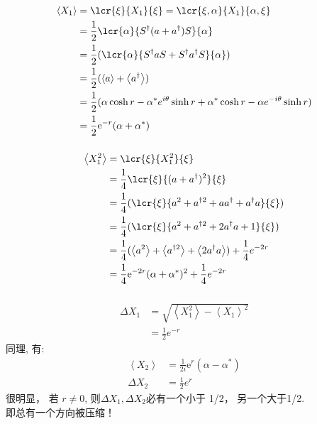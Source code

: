 \begin{frame}
 \frametitle{}
 \例 [5. 试计算压缩光场正交分量的量子涨落 ]{
    \[ \Delta X_1 \Delta X_2 =\dfrac{1}{4}, \qquad  \Delta X_1 = \frac{1}{2} e^{-r} , \qquad \Delta X_2 = \frac{1}{2} e^r\]}
    \解~  
    \[\begin{aligned}
        \left\langle X_1 \right\rangle &= \lcr {\xi} {X_1} {\xi} = \lcr {\xi,\alpha} {X_1} {\alpha,\xi}\\
        &= \frac{1}{2}\lcr {\alpha} {S^\dagger(a+ a^{\dagger})S } {\alpha}\\
        &= \frac{1}{2}(\lcr {\alpha} {S^\dagger a S + S^\dagger a^{\dagger}S } {\alpha} )  \\ 
        &= \frac{1}{2}(\left\langle a \right\rangle + \left\langle a^\dagger \right\rangle)  \\ 
        &= \frac{1}{2}( \alpha \cosh r- \alpha^{*}  e^{i\theta}\sinh r + \alpha^{*} \cosh r -\alpha  e^{-i\theta}\sinh r ) \\ 
        &= \frac{1}{2} \mathrm{e}^{-r} (\alpha + \alpha^*)  
    \end{aligned} \]
\end{frame}

\begin{frame}
 \frametitle{}
 \[\begin{aligned}
    \left\langle X_1 ^2 \right\rangle &= \lcr {\xi} {X_1 ^2} {\xi}\\
    &= \frac{1}{4}\lcr {\xi} {(a+ a^{\dagger})^2 } {\xi}\\
    &= \frac{1}{4}(\lcr {\xi} { a^2 + a^{\dagger 2 }  + a a^{\dagger} + a^{\dagger} a } {\xi} )  \\ 
    &= \frac{1}{4}(\lcr {\xi} { a^2 + a^{\dagger 2 }  + 2 a^{\dagger} a +1 } {\xi} )  \\ 
    &= \frac{1}{4}( \left\langle a^2 \right\rangle + \left\langle a^{\dagger 2 } \right\rangle + \left\langle 2 a^{\dagger} a \right\rangle ) + \frac{1}{4} e^{-2r}    \\ 
    &= \frac{1}{4} \mathrm{e}^{-2r} (\alpha + \alpha^*)^2 +  \frac{1}{4} e^{-2r} 
\end{aligned} \]
\end{frame}

\begin{frame}
    \frametitle{}
    \[\begin{aligned}
       \Delta X_1 &= \sqrt{ \left\langle X_1 ^2 \right\rangle - \left\langle X_1 \right\rangle ^2 } \\ 
       &=\frac{1}{2} e^{-r}  
   \end{aligned} \]     
   同理, 有: 
   \[\begin{aligned}
    \left\langle X_2 \right\rangle &= \frac{1}{2i} \mathrm{e}^{r} (\alpha - \alpha^*) \\ 
    \Delta X_2 &= \frac{1}{2} e^{r}  
\end{aligned} \]  
    很明显， 若 $r \not = 0$, 则$\Delta X_1, \Delta X_2$必有一个小于 1/2， 另一个大于1/2. \\ 
    即总有一个方向被压缩！
\end{frame}

